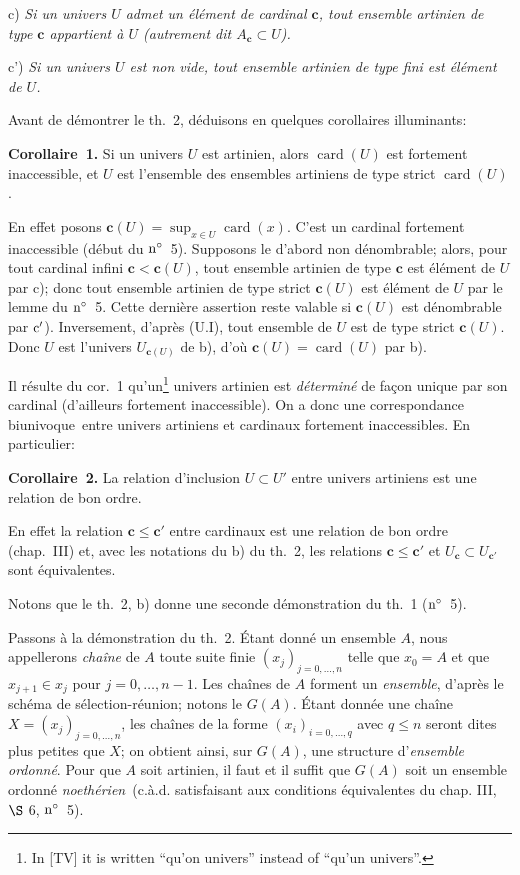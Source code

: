 \documentclass[12pt]{article}
\newcommand{\nn}{\noindent}
\newcommand{\card}{\operatorname{card}}
\begin{document}
\nn c) \emph{Si un univers $U$ admet un élément de cardinal $\mathbf c$, tout ensemble artinien de type $\mathbf c$ appartient à $U$ (autrement dit $A_{\mathbf c}\subset U$).}

\nn c') \emph{Si un univers $U$ est non vide, tout ensemble artinien de type fini est élément de $U$.}

Avant de démontrer le th.~2, déduisons en quelques corollaires illuminants:

\nn \textbf{Corollaire~1.} Si un univers $U$ est artinien, alors $\card(U)$ est fortement inaccessible, et $U$ est l'ensemble des ensembles artiniens de type strict $\card(U)$.

En effet posons $\mathbf c(U)=\sup_{x\in U}\card(x)$. C'est un cardinal fortement inaccessible (début du $\rm n^\circ$~5). Supposons le d'abord non dénombrable; alors, pour tout cardinal infini $\mathbf c < \mathbf c(U)$, tout ensemble artinien de type $\mathbf c$ est élément de $U$ par c); donc tout ensemble artinien de type strict $\mathbf c(U)$ est élément de $U$ par le lemme du $\rm n^\circ$~5. Cette dernière assertion reste valable si $\mathbf c(U)$ est dénombrable par $\rm c'$). Inversement, d'après (U.I), tout ensemble de $U$ est de type strict $\mathbf c(U)$. Donc $U$ est l'univers $U_{\mathbf c(U)}$ de b), d'où $\mathbf c(U)=\card(U)$ par b).

Il résulte du cor.~1 qu'un\footnote{In [TV] it is written ``qu'on univers'' instead of ``qu'un univers''.} univers artinien est \emph{déterminé} de façon unique par son cardinal (d'ailleurs fortement inaccessible). On a donc une \og correspondance biunivoque\fg\ entre univers artiniens et cardinaux fortement inaccessibles. En particulier:

\nn\textbf{Corollaire~2.}  La relation d'inclusion $U\subset U'$ entre univers artiniens est une relation de bon ordre.

En effet la relation $\mathbf c\leq\mathbf c'$ entre cardinaux est une relation de bon ordre (chap.~III) et, avec les notations du b) du th.~2, les relations $\mathbf c\leq\mathbf c'$ et $U_{\mathbf c}\subset U_{\mathbf c'}$ sont équivalentes.

Notons que le th.~2, b) donne une seconde démonstration du th.~1 ($\rm n^\circ$~5).

Passons à la démonstration du th.~2. \'Etant donné un ensemble $A$, nous appellerons \emph{chaîne} de $A$ toute suite finie $(x_j)_{j=0,\ldots,n}$ telle que $x_0=A$ et que $x_{j+1}\in x_j$ pour $j=0,\ldots,n-1$. Les chaînes de $A$ forment un \emph{ensemble}, d'après le schéma de sélection-réunion; notons le $G(A)$. \'Etant donnée une chaîne $X=(x_j)_{j=0,\ldots,n}$, les chaînes de la forme $(x_i)_{i=0,\ldots,q}$ avec $q\leq n$ seront dites plus petites que $X$; on obtient ainsi, sur $G(A)$, une structure d'\emph{ensemble ordonné}. Pour que $A$ soit artinien, il faut et il suffit que $G(A)$ soit un ensemble ordonné \og\emph{noethérien}\fg\ (c.à.d. satisfaisant aux conditions équivalentes du chap. III, $\S$ 6, $\rm n^\circ$~5).
\end{document}
